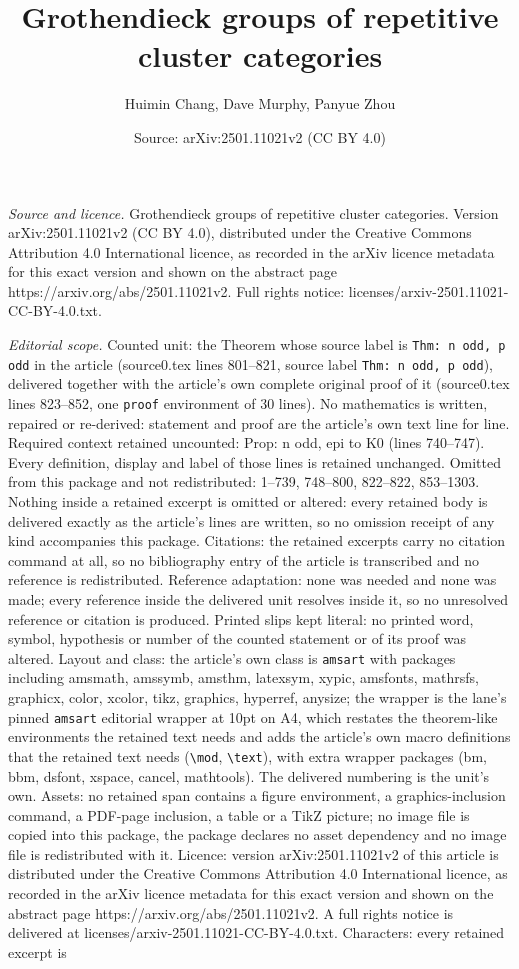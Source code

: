 \documentclass[10pt,a4paper]{amsart}
\title[Grothendieck groups of repetitive cluster categories]{Grothendieck groups of repetitive cluster categories}
\author{Huimin Chang, Dave Murphy, Panyue Zhou}
\date{Source: arXiv:2501.11021v2 (CC BY 4.0)}
\begin{document}
\maketitle

\noindent\emph{Source and licence.} Grothendieck groups of repetitive cluster categories. Version arXiv:2501.11021v2 (CC BY 4.0), distributed under the Creative Commons Attribution 4.0 International licence, as recorded in the arXiv licence metadata for this exact version and shown on the abstract page https://arxiv.org/abs/2501.11021v2. Full rights notice: licenses/arxiv-2501.11021-CC-BY-4.0.txt.\par\smallskip

\noindent\textit{Editorial scope.} Counted unit: the Theorem whose source label is \texttt{Thm: n odd, p odd} in the article (source0.tex lines 801--821, source label \texttt{Thm: n odd, p odd}), delivered together with the article's own complete original proof of it (source0.tex lines 823--852, one \texttt{proof} environment of 30 lines). No mathematics is written, repaired or re-derived: statement and proof are the article's own text line for line. Required context retained uncounted: Prop: n odd, epi to K0 (lines 740--747). Every definition, display and label of those lines is retained unchanged. Omitted from this package and not redistributed: 1--739, 748--800, 822--822, 853--1303. Nothing inside a retained excerpt is omitted or altered: every retained body is delivered exactly as the article's lines are written, so no omission receipt of any kind accompanies this package. Citations: the retained excerpts carry no citation command at all, so no bibliography entry of the article is transcribed and no reference is redistributed. Reference adaptation: none was needed and none was made; every reference inside the delivered unit resolves inside it, so no unresolved reference or citation is produced. Printed slips kept literal: no printed word, symbol, hypothesis or number of the counted statement or of its proof was altered. Layout and class: the article's own class is \texttt{amsart} with packages including amsmath, amssymb, amsthm, latexsym, xypic, amsfonts, mathrsfs, graphicx, color, xcolor, tikz, graphics, hyperref, anysize; the wrapper is the lane's pinned \texttt{amsart} editorial wrapper at 10pt on A4, which restates the theorem-like environments the retained text needs and adds the article's own macro definitions that the retained text needs (\texttt{\textbackslash mod}, \texttt{\textbackslash text}), with extra wrapper packages (bm, bbm, dsfont, xspace, cancel, mathtools). The delivered numbering is the unit's own. Assets: no retained span contains a figure environment, a graphics-inclusion command, a PDF-page inclusion, a table or a TikZ picture; no image file is copied into this package, the package declares no asset dependency and no image file is redistributed with it. Licence: version arXiv:2501.11021v2 of this article is distributed under the Creative Commons Attribution 4.0 International licence, as recorded in the arXiv licence metadata for this exact version and shown on the abstract page https://arxiv.org/abs/2501.11021v2. A full rights notice is delivered at licenses/arxiv-2501.11021-CC-BY-4.0.txt. Characters: every retained excerpt is 
\end{document}
